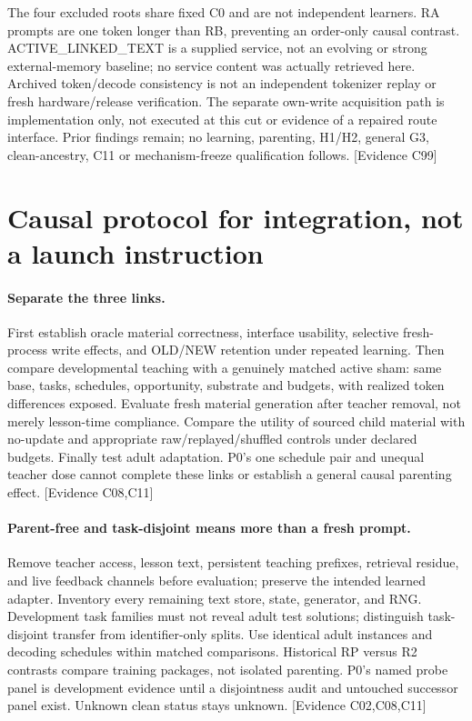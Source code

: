 \documentclass[11pt]{article}
\newcommand{\ev}[1]{\textsf{[Evidence #1]}}
\begin{document}
The four excluded roots share fixed C0 and are not independent learners. RA
prompts are one token longer than RB, preventing an order-only causal contrast.
ACTIVE\_LINKED\_TEXT is a supplied service, not an evolving or strong
external-memory baseline; no service content was actually retrieved here.
Archived token/decode consistency is not an independent tokenizer replay or
fresh hardware/release verification. The separate own-write acquisition path
is implementation only, not executed at this cut or evidence of a repaired
route interface. Prior findings remain; no learning, parenting, H1/H2, general
G3, clean-ancestry, C11 or mechanism-freeze qualification follows. \ev{C99}

\section{Causal protocol for integration, not a launch instruction}
\paragraph{Separate the three links.} First establish oracle material correctness,
interface usability, selective fresh-process write effects, and OLD/NEW retention
under repeated learning. Then compare developmental teaching with a genuinely
matched active sham: same base, tasks, schedules, opportunity, substrate and
budgets, with realized token differences exposed. Evaluate fresh material
generation after teacher removal, not merely lesson-time compliance. Compare
the utility of sourced child material with no-update and appropriate
raw/replayed/shuffled controls under declared budgets. Finally test adult
adaptation. P0's one schedule pair and unequal teacher dose cannot complete these
links or establish a general causal parenting effect. \ev{C08,C11}

\paragraph{Parent-free and task-disjoint means more than a fresh prompt.}
Remove teacher access, lesson text, persistent teaching prefixes, retrieval
residue, and live feedback channels before evaluation; preserve the intended
learned adapter. Inventory every remaining text store, state, generator, and RNG.
Development task families must not reveal adult test solutions; distinguish
task-disjoint transfer from identifier-only splits. Use identical adult instances
and decoding schedules within matched comparisons. Historical RP versus R2
contrasts compare training packages, not isolated parenting. P0's named probe
panel is development evidence until a disjointness audit and untouched successor
panel exist. Unknown clean status stays unknown. \ev{C02,C08,C11}
\end{document}
